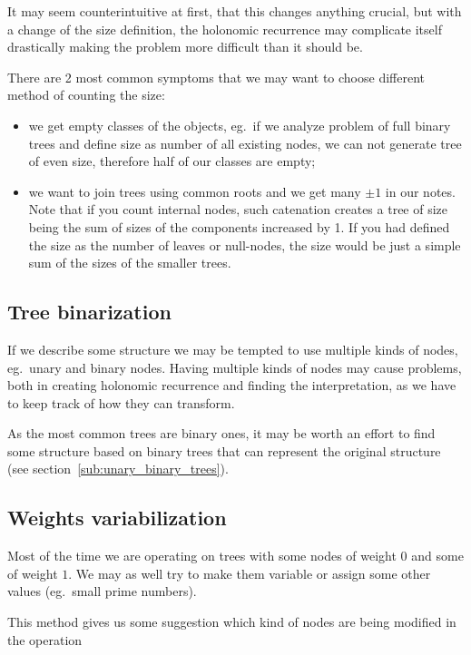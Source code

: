 \documentclass[final]{article}
\theoremstyle{definition}
\theoremstyle{remark}
\begin{document}
It may seem counterintuitive at first, that this changes anything crucial, but with a change of the size definition, the holonomic recurrence may complicate itself drastically making the problem more difficult than it should be.

There are 2 most common symptoms that we may want to choose different method of counting the size:
\begin{itemize}
    \item we get empty classes of the objects, eg.\ if we analyze problem of full binary trees and define size as number of all existing nodes, we can not generate tree of even size, therefore half of our classes are empty;
    \item we want to join trees using common roots and we get many \(\pm1\) in our notes. Note that if you count internal nodes, such catenation creates a tree of size being the sum of sizes of the components increased by 1. If you had defined the size as the number of leaves or null-nodes, the size would be just a simple sum of the sizes of the smaller trees.
\end{itemize}

\subsection{Tree binarization}%
\label{sub:tree_binarization}

If we describe some structure we may be tempted to use multiple kinds of nodes, eg.~unary and binary nodes. Having multiple kinds of nodes may cause problems, both in creating holonomic recurrence and finding the interpretation, as we have to keep track of how they can transform.

As the most common trees are binary ones, it may be worth an effort to find some structure based on binary trees that can represent the original structure (see section~\ref{sub:unary_binary_trees}).

\subsection{Weights variabilization}%
\label{sub:weights_variablization}

Most of the time we are operating on trees with some nodes of weight \(0\) and some of weight \(1\). We may as well try to make them variable or assign some other values (eg.\ small prime numbers).

This method gives us some suggestion which kind of nodes are being modified in the operation
\end{document}
